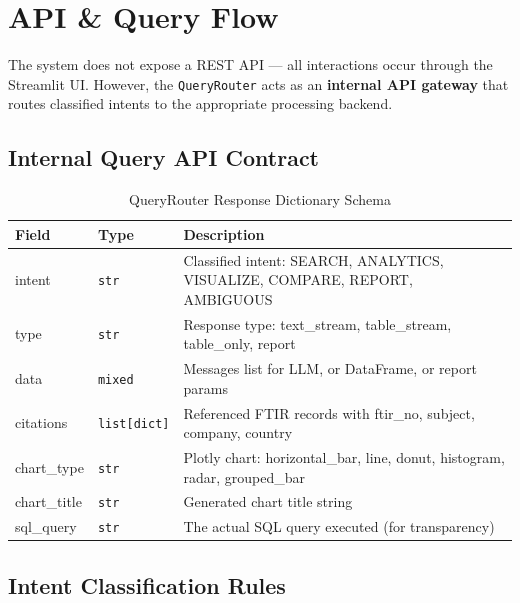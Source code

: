 \documentclass[12pt, a4paper, twoside]{article}
\begin{document}
\newpage

\section{API \& Query Flow}

The system does not expose a REST API — all interactions occur through the Streamlit UI. However, the \texttt{QueryRouter} acts as an \textbf{internal API gateway} that routes classified intents to the appropriate processing backend.

\subsection{Internal Query API Contract}

\begin{table}[H]
\centering
\caption{QueryRouter Response Dictionary Schema}
\label{tab:api-contract}
\begin{tabularx}{\textwidth}{L{2cm} L{2cm} X}
\toprule
{}\color{white}\textbf{Field} & \color{white}\textbf{Type} & \color{white}\textbf{Description} \\
\midrule
intent & \texttt{str} & Classified intent: SEARCH, ANALYTICS, VISUALIZE, COMPARE, REPORT, AMBIGUOUS \\
type & \texttt{str} & Response type: text\_stream, table\_stream, table\_only, report \\
data & \texttt{mixed} & Messages list for LLM, or DataFrame, or report params \\
citations & \texttt{list[dict]} & Referenced FTIR records with ftir\_no, subject, company, country \\
chart\_type & \texttt{str} & Plotly chart: horizontal\_bar, line, donut, histogram, radar, grouped\_bar \\
chart\_title & \texttt{str} & Generated chart title string \\
sql\_query & \texttt{str} & The actual SQL query executed (for transparency) \\
\bottomrule
\end{tabularx}
\end{table}

\subsection{Intent Classification Rules}
\end{document}
